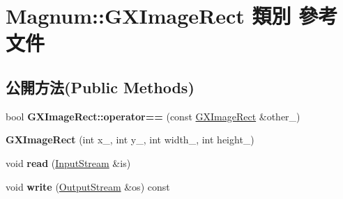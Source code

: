\hypertarget{class_magnum_1_1_g_x_image_rect}{}\section{Magnum\+:\+:G\+X\+Image\+Rect 類別 參考文件}
\label{class_magnum_1_1_g_x_image_rect}
\subsection*{公開方法(Public Methods)}
\begin{DoxyCompactItemize}
\item 
bool {\bfseries G\+X\+Image\+Rect\+::operator==} (const \hyperlink{class_magnum_1_1_g_x_image_rect}{G\+X\+Image\+Rect} \&other\+\_\+)\hypertarget{class_magnum_1_1_g_x_image_rect_a638d25eb16962e85d1e0036304d26d75}{}\label{class_magnum_1_1_g_x_image_rect_a638d25eb16962e85d1e0036304d26d75}

\item 
{\bfseries G\+X\+Image\+Rect} (int x\+\_\+, int y\+\_\+, int width\+\_\+, int height\+\_\+)\hypertarget{class_magnum_1_1_g_x_image_rect_a5e772cb746549f260fcfa1a23ce5bdc7}{}\label{class_magnum_1_1_g_x_image_rect_a5e772cb746549f260fcfa1a23ce5bdc7}

\item 
void {\bfseries read} (\hyperlink{class_magnum_1_1_input_stream}{Input\+Stream} \&is)\hypertarget{class_magnum_1_1_g_x_image_rect_a11fcc17d15516da95cc8f9f45ec5ab1b}{}\label{class_magnum_1_1_g_x_image_rect_a11fcc17d15516da95cc8f9f45ec5ab1b}

\item 
void {\bfseries write} (\hyperlink{class_magnum_1_1_output_stream}{Output\+Stream} \&os) const \hypertarget{class_magnum_1_1_g_x_image_rect_ad33251ee7b10a6d710c7a37c525fa1b4}{}\label{class_magnum_1_1_g_x_image_rect_ad33251ee7b10a6d710c7a37c525fa1b4}

\end{DoxyCompactItemize}
